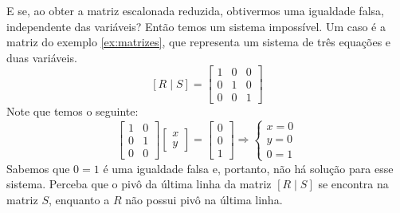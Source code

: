 \documentclass[../main.tex]{subfiles}
\begin{document}
			E se, ao obter a matriz escalonada reduzida, obtivermos uma igualdade falsa, independente das variáveis? Então temos um sistema impossível. Um caso é a matriz do exemplo \ref{ex:matrizes}, que representa um sistema de três equações e duas variáveis.
			\[
			[R\mid S]=\begin{bmatrix}
				1 & 0 & 0\\
				0 & 1 & 0\\
				0 & 0 & 1
			\end{bmatrix}
			\]
			Note que temos o seguinte:
			\[
			\begin{bmatrix}
				1 & 0\\
				0 & 1\\
				0 & 0
			\end{bmatrix}
			\begin{bmatrix}
				x\\y
			\end{bmatrix}=
			\begin{bmatrix}
				0 \\ 0 \\1
			\end{bmatrix}
			\Rightarrow
			\begin{cases}
				x=0\\
				y=0\\
				0=1
			\end{cases}
			\]
			Sabemos que $0=1$ é uma igualdade falsa e, portanto, não há solução para esse sistema. Perceba que o pivô da última linha da matriz $[R\mid S]$ se encontra na matriz $S$, enquanto a $R$ não possui pivô na última linha.
			
\end{document}
